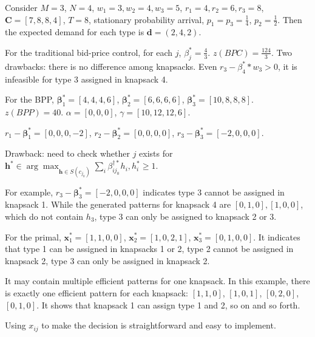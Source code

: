 \begin{example}
Consider $M =3$, $N =4$, $w_{1} = 3, w_{2} = 4, w_{3} = 5$, $r_{1} = 4, r_{2} = 6, r_{3} = 8$, $\bm{C} = [7, 8, 8, 4]$, $T = 8$, stationary probability arrival, $p_{1} = p_{3} = \frac{1}{4}$, $p_{2} = \frac{1}{2}$. Then the expected demand for each type is $\bm{d} = (2, 4, 2)$.

For the traditional bid-price control, for each $j$, $\beta_{j}^{*} = \frac{4}{3}$. $z(BPC) = \frac{124}{3}$. Two drawbacks: there is no difference among knapsacks. Even $r_{3} - \beta_{4}^{*} * w_{3} > 0$, it is infeasible for type 3 assigned in knapsack 4.

For the BPP, $\bm{\beta}_{1}^{*} = [4, 4, 4, 6]$, $\bm{\beta}_{2}^{*} = [6, 6, 6, 6]$, $\bm{\beta}_{3}^{*} = [10, 8, 8, 8]$. $z(BPP) = 40$. $\alpha = [0, 0, 0]$, $\gamma = [10, 12, 12, 6]$.

$r_{1} - \bm{\beta}_{1}^{*} = [0, 0, 0, -2]$, $r_{2} - \bm{\beta}_{2}^{*} = [0, 0, 0, 0]$, $r_{3} - \bm{\beta}_{3}^{*} = [-2, 0, 0, 0]$.

Drawback: need to check whether $j$ exists for $\bm{h}^{*} \in \arg\max_{\bm{h} \in S(c_{j_0})} \sum_{i} \beta_{ij_0}^{\dag *} h_{i}, h_{i}^{*} \geq 1$.

For example, $r_{3} - \bm{\beta}_{3}^{*} = [-2, 0, 0, 0]$ indicates type 3 cannot be assigned in knapsack 1. While the generated patterns for knapsack 4 are $[0, 1, 0], [1, 0, 0]$, which do not contain $h_{3}$, type 3 can only be assigned to knapsack 2 or 3.


For the primal, $\bm{x}_{1}^{*} = [1, 1, 0, 0]$, $\bm{x}_{2}^{*} = [1, 0, 2, 1]$, $\bm{x}_{3}^{*} = [0, 1, 0, 0]$. It indicates that type 1 can be assigned in knapsacks 1 or 2, type 2 cannot be assigned in knapsack 2, type 3 can only be assigned in knapsack 2. 

It may contain multiple efficient patterns for one knapsack. In this example, there is exactly one efficient pattern for each knapsack: $[1, 1, 0]$, $[1, 0, 1]$, $[0, 2, 0]$, $[0, 1, 0]$. It shows that knapsack 1 can assign type 1 and 2, so on and so forth.

Using $x_{ij}$ to make the decision is straightforward and easy to implement.

\end{example}


